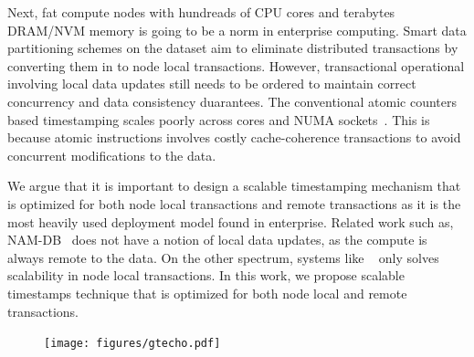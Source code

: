 Next, fat compute nodes with hundreads of CPU cores and terabytes DRAM/NVM memory is going
to be a norm in enterprise computing. Smart data partitioning schemes on the dataset aim to
eliminate distributed transactions by converting them in to node local transactions.
However, transactional operational involving local data updates still needs to be ordered 
to maintain correct concurrency and data consistency duarantees. The conventional atomic
counters based timestamping scales poorly across cores and NUMA sockets~\cite{ordo}. This 
is because atomic instructions involves costly cache-coherence transactions to avoid 
concurrent modifications to the data.


We argue that it is important to design a scalable timestamping mechanism that is 
optimized for both node local transactions and remote transactions as it is the most 
heavily used deployment model found in enterprise.
Related work such as, NAM-DB~\cite{namdb} does not have a notion of local
data updates, as the compute is always remote to the data. On the other spectrum, 
systems like ~\cite{cicada} only solves scalability in node local transactions.
In this work, we propose scalable timestamps technique that is optimized for both
node local and remote transactions.



\begin{figure}[]   
	\centering
	\texttt{[image: figures/gtecho.pdf]} 
	\caption{\small } 
	\label{fig:gtecho} 
\end{figure}
